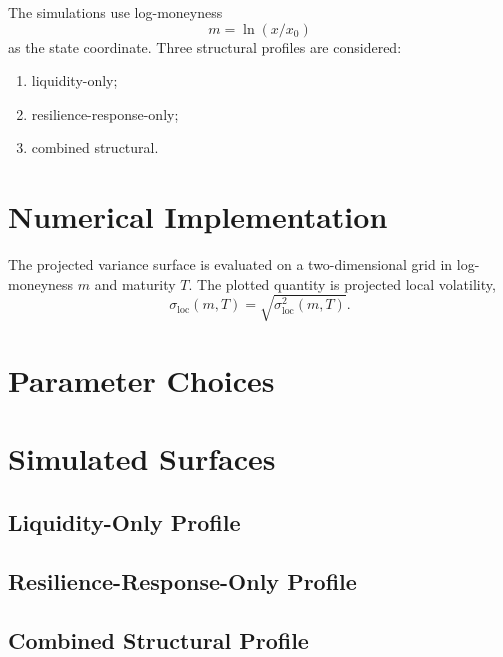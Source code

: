 \documentclass[11pt]{article}
\begin{document}
The simulations use log-moneyness
\[
 m=\ln(x/x_0)
\]
as the state coordinate. Three structural profiles are considered:
\begin{enumerate}
 \item liquidity-only;
 \item resilience-response-only;
 \item combined structural.
\end{enumerate}

\section{Numerical Implementation}

The projected variance surface is evaluated on a two-dimensional grid in
log-moneyness \(m\) and maturity \(T\). The plotted quantity is projected
local volatility,
\[
 \sigma_{\mathrm{loc}}(m,T)
 =
 \sqrt{\sigma_{\mathrm{loc}}^2(m,T)}.
\]

\section{Parameter Choices}


\section{Simulated Surfaces}

\subsection{Liquidity-Only Profile}


\subsection{Resilience-Response-Only Profile}


\subsection{Combined Structural Profile}
\end{document}
